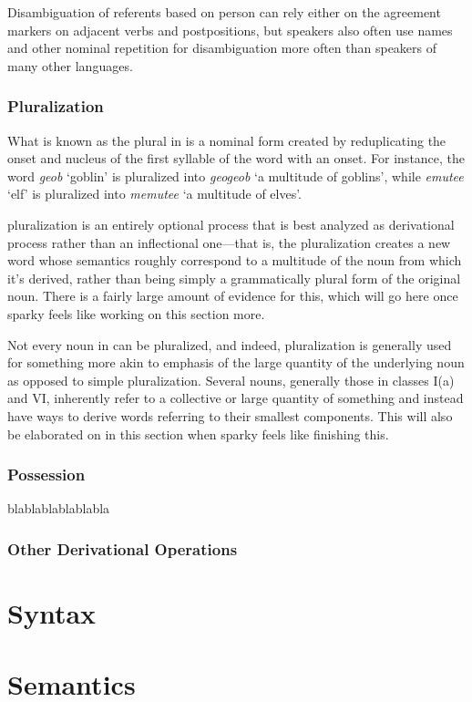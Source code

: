 \documentclass[a4paper,11pt,oneside,openany]{memoir}
\begin{document}
    

Disambiguation of referents based on person can rely either on the agreement markers on adjacent verbs and postpositions, but speakers also often use names and other nominal repetition for disambiguation more often than speakers of many other languages.

\subsection{Pluralization}

What is known as the plural in \lang{} is a nominal form created by reduplicating the onset and nucleus of the first syllable of the word with an onset. For instance, the word \emph{geob} `goblin' is pluralized into \emph{geogeob} `a multitude of goblins', while \emph{emutee} `elf' is pluralized into \emph{memutee} `a multitude of elves'.

\lang{} pluralization is an entirely optional process that is best analyzed as derivational process rather than an inflectional one---that is, the pluralization creates a new word whose semantics roughly correspond to a multitude of the noun from which it's derived, rather than being simply a grammatically plural form of the original noun. There is a fairly large amount of evidence for this, which will go here once sparky feels like working on this section more.

Not every noun in \lang{} can be pluralized, and indeed, pluralization is generally used for something more akin to emphasis of the large quantity of the underlying noun as opposed to simple pluralization. Several nouns, generally those in classes I(a) and VI, inherently refer to a collective or large quantity of something and instead have ways to derive words referring to their smallest components. This will also be elaborated on in this section when sparky feels like finishing this.

\subsection{Possession}\label{ssec:possession}

blablablablablabla

\subsection{Other Derivational Operations}

\chapter{Syntax}

\chapter{Semantics}


\end{document}
